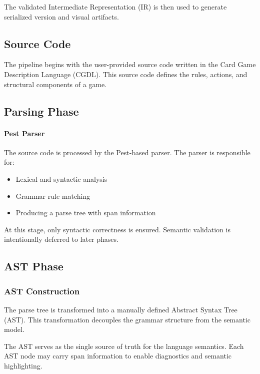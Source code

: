 \documentclass[a4paper,11pt]{article}
\begin{document}
The validated Intermediate Representation (IR) is then used to generate
serialized version and visual artifacts.

\subsection{Source Code}

The pipeline begins with the user-provided source code written in the
Card Game Description Language (CGDL). This source code defines the rules,
actions, and structural components of a game.

\subsection{Parsing Phase}

\paragraph{Pest Parser}

The source code is processed by the Pest-based parser. The parser is
responsible for:

\begin{itemize}
    \item Lexical and syntactic analysis
    \item Grammar rule matching
    \item Producing a parse tree with span information
\end{itemize}

At this stage, only syntactic correctness is ensured. Semantic validation
is intentionally deferred to later phases.

\subsection{AST Phase}

\subsubsection{AST Construction}

The parse tree is transformed into a manually defined Abstract Syntax Tree (AST).
This transformation decouples the grammar structure from the semantic model.

The AST serves as the single source of truth for the language semantics.
Each AST node may carry span information to enable diagnostics and
semantic highlighting.
\end{document}

